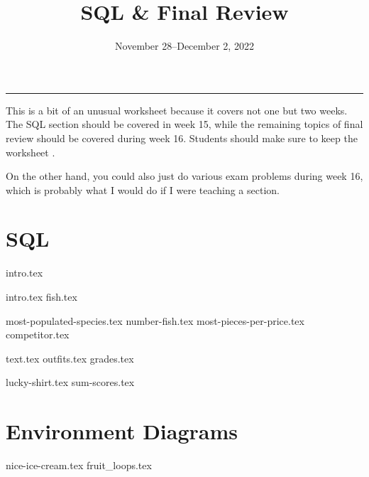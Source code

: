 \documentclass{exam}
\title{SQL \& Final Review}
\date{November 28--December 2, 2022}
\begin{document}
\maketitle\rule{\textwidth}{0.15em}

\begin{guide}
    This is a bit of an unusual worksheet because it covers not one but two weeks. The SQL section should be covered in week 15, while the 
    remaining topics of final review should be covered during week 16. Students should make sure to keep the worksheet . 

    On the other hand, you could also just do various exam problems during week 16, which is probably what I would do if I were teaching a section. 
\end{guide}


\section{SQL}
{intro.tex}


\begin{questions}
  \question 
  {intro.tex}
  {fish.tex}
  \begin{parts}
    {most-populated-species.tex}
    {number-fish.tex}
    {most-pieces-per-price.tex}
    {competitor.tex}
  \end{parts}
  \question
  {text.tex}
  {outfits.tex}
  {grades.tex}
  \begin{parts}
  {lucky-shirt.tex}
  {sum-scores.tex}
  \end{parts}
\end{questions}


\section{Environment Diagrams}
\begin{questions}
{nice-ice-cream.tex}
{fruit_loops.tex}
\end{questions}
\end{document}
